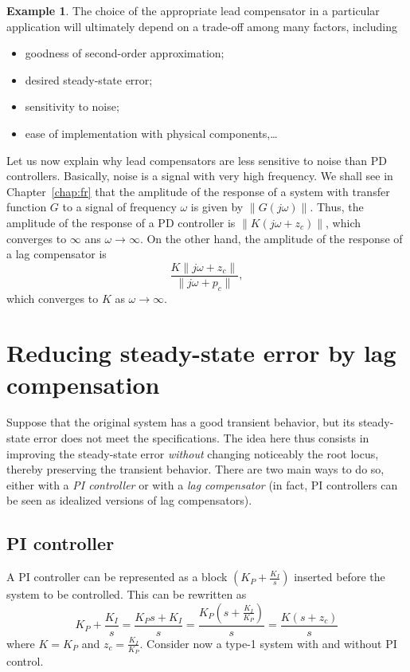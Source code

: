 \documentclass[a4paper,11pt]{report}
\theoremstyle{definition}
\newtheorem{mdexample}{Example}
\newenvironment{example}%
  {\vspace{0.1cm}\begin{mdframed}[backgroundcolor=lightgray]\begin{mdexample}}%
  {\end{mdexample}\end{mdframed}\vspace{0.1cm}}
\begin{document}
\begin{example}
  The choice of the appropriate lead compensator in a particular
  application will ultimately depend on a trade-off among many
  factors, including
  \begin{itemize}
  \item goodness of second-order approximation;
  \item desired steady-state error;
  \item sensitivity to noise;
  \item ease of implementation with physical components,\dots
  \end{itemize}
\end{example}

Let us now explain why lead compensators are less sensitive to noise
than PD controllers. Basically, noise is a signal with very high
frequency. We shall see in Chapter~\ref{chap:fr} that the amplitude of
the response of a system with transfer function $G$ to a signal of
frequency $\omega$ is given by $\|G(j\omega)\|$. Thus, the amplitude
of the response of a PD controller is $\|K(j\omega+z_c)\|$, which
converges to $\infty$ ans $\omega\to\infty$. On the other hand, the
amplitude of the response of a lag compensator is
\[
\frac{K\|j\omega+z_c\|}{\|j\omega+p_c\|},
\]
which converges to $K$ as $\omega\to\infty$.


\section{Reducing steady-state error by lag compensation}

Suppose that the original system has a good transient behavior, but
its steady-state error does not meet the specifications. The idea here
thus consists in improving the steady-state error \emph{without}
changing noticeably the root locus, thereby preserving the transient
behavior. There are two main ways to do so, either with a \emph{PI
  controller} or with a \emph{lag compensator} (in fact, PI
controllers can be seen as idealized versions of lag compensators).

\subsection{PI controller}

A PI controller can be represented as a block $(K_P+\frac{K_I}{s})$
inserted before the system to be controlled. This can be rewritten as
\[
K_P+\frac{K_I}{s} = \frac{K_Ps+K_I}{s} =
\frac{K_P\left(s+\frac{K_I}{K_P}\right)}{s} = \frac{K(s+z_c)}{s}
\]
where $K=K_P$ and $z_c=\frac{K_I}{K_P}$. Consider now a type-1 system
with and without PI control.
\end{document}
